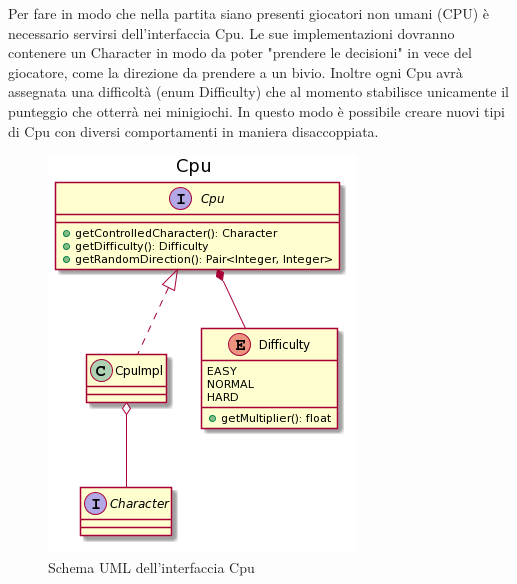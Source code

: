 \documentclass[a4paper,12pt]{report}
\begin{document}
	Per fare in modo che nella partita siano presenti giocatori non umani (CPU) è necessario servirsi
	dell'interfaccia Cpu.\newline
	Le sue implementazioni dovranno contenere un Character in modo da poter "prendere le decisioni" in vece del giocatore, come la direzione da prendere a un bivio.\newline
	Inoltre ogni Cpu avrà assegnata una difficoltà (enum Difficulty) che al momento stabilisce unicamente il punteggio che otterrà nei minigiochi.\newline
	In questo modo è possibile creare nuovi tipi di Cpu con diversi comportamenti in maniera disaccoppiata.
    \begin{figure}[!t]
        \centering{}
        \includegraphics{images/picchiotti/cpu.png}
        \caption{Schema UML dell'interfaccia Cpu}
        \label{img:cpu}
    \end{figure}
\end{document}
